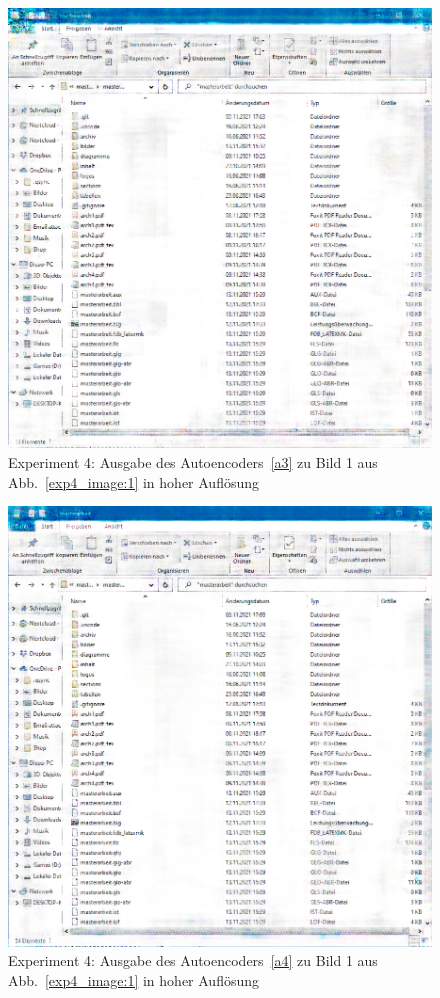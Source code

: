 \begin{figure} [ht]
  \centering
  \includegraphics[width=\textwidth]{bilder/result_exp4/3_pred_a3.png}

  \caption{Experiment 4: Ausgabe des Autoencoders~\ref{a3} zu Bild 1 aus Abb.~\ref{exp4_image:1} in hoher Auflösung}
\end{figure}

\begin{figure} [ht]
  \centering
  \includegraphics[width=\textwidth]{bilder/result_exp4/3_pred_a4.png}

  \caption{Experiment 4: Ausgabe des Autoencoders~\ref{a4} zu Bild 1 aus Abb.~\ref{exp4_image:1} in hoher Auflösung}
\end{figure}


